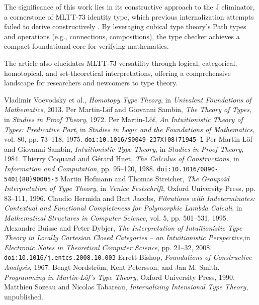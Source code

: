 \documentclass{article}
\theoremstyle{definition}
\begin{document}
The significance of this work lies in its constructive approach to the
J eliminator, a cornerstone of MLTT-73 identity type, which previous
internalization attempts failed to derive constructively \cite{Lof75, Nordstrom90}.
By leveraging cubical type theory’s Path types and operations (e.g., connections,
compositions), the type checker achieves a compact foundational core for verifying mathematics.

The article also elucidates MLTT-73 versatility through logical, categorical,
homotopical, and set-theoretical interpretations, offering a comprehensive
landscape for researchers and newcomers to type theory.

\begin{thebibliography}{99}

 Vladimir Voevodsky et al., \textit{Homotopy Type Theory}, in \textit{Univalent Foundations of Mathematics}, 2013.
 Per Martin-Löf and Giovanni Sambin, \textit{The Theory of Types}, in \textit{Studies in Proof Theory}, 1972.
 Per Martin-Löf, \textit{An Intuitionistic Theory of Types: Predicative Part}, in \textit{Studies in Logic and the Foundations of Mathematics}, vol. 80, pp. 73–118, 1975. \texttt{doi:10.1016/S0049-237X(08)71945-1}
 Per Martin-Löf and Giovanni Sambin, \textit{Intuitionistic Type Theory}, in \textit{Studies in Proof Theory}, 1984.
 Thierry Coquand and Gérard Huet, \textit{The Calculus of Constructions}, in \textit{Information and Computation}, pp. 95–120, 1988. \texttt{doi:10.1016/0890-5401(88)90005-3}
 Martin Hofmann and Thomas Streicher, \textit{The Groupoid Interpretation of Type Theory}, in \textit{Venice Festschrift}, Oxford University Press, pp. 83–111, 1996. 
 Claudio Hermida and Bart Jacobs, \textit{Fibrations with Indeterminates: Contextual and Functional Completeness for Polymorphic Lambda Calculi}, in \textit{Mathematical Structures in Computer Science}, vol. 5, pp. 501–531, 1995.
 Alexandre Buisse and Peter Dybjer, \textit{The Interpretation of Intuitionistic Type Theory in Locally Cartesian Closed Categories -- an Intuitionistic Perspective},in \textit{Electronic Notes in Theoretical Computer Science}, pp. 21–32, 2008. \texttt{doi:10.1016/j.entcs.2008.10.003}
 Errett Bishop, \textit{Foundations of Constructive Analysis}, 1967.
 Bengt Nordström, Kent Petersson, and Jan M. Smith, \textit{Programming in Martin-Löf’s Type Theory}, Oxford University Press, 1990.
 Matthieu Sozeau and Nicolas Tabareau, \textit{Internalizing Intensional Type Theory}, unpublished.

\end{thebibliography}
\end{document}
